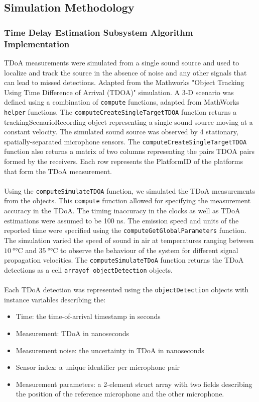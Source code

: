 \documentclass[a4paper,11pt]{article}
\begin{document}
\subsection{Simulation Methodology}

  
\subsubsection{Time Delay Estimation Subsystem Algorithm Implementation}
TDoA measurements were simulated from a single sound source and used to localize and track the source in the absence of noise and any other signals that can lead to missed detections. Adapted from the Mathworks "Object Tracking Using Time Difference of Arrival (TDOA)" simulation. A 3-D scenario was defined using a combination of \texttt{compute} functions, adapted from MathWorks \texttt{helper} functions. The \texttt{computeCreateSingleTargetTDOA} function returns a trackingScenarioRecording object representing a single sound source moving at a constant velocity. The simulated sound source was observed by 4 stationary, spatially-separated microphone sensors. The \texttt{computeCreateSingleTargetTDOA} function also returns a matrix of two columns representing the pairs TDOA pairs formed by the receivers. Each row represents the PlatformID of the platforms that form the TDoA measurement. \\\\
Using the \texttt{computeSimulateTDOA} function, we simulated the TDoA measurements from the objects. This \texttt{compute} function allowed for specifying the measurement accuracy in the TDoA. The timing inaccuracy in the clocks as well as TDoA estimations were assumed to be 100 ns. The emission speed and units of the reported time were specified using the \texttt{computeGetGlobalParameters} function. The simulation varied the speed of sound in air at temperatures ranging between $\SI{10}{\degree\celsius}$ and $\SI{35}{\degree\celsius}$ to observe the behaviour of the system for different signal propagation velocities. The \texttt{computeSimulateTDoA} function returns the TDoA detections as a cell \texttt{arrayof objectDetection} objects. \\\\
Each TDoA detection was represented using the \texttt{objectDetection} objects with instance variables describing the: \\
\begin{itemize}
	\item 
	Time: the time-of-arrival timestamp in seconds 
	\item
	Measurement: TDoA in nanoseconds 
	\item
	Measurement noise: the uncertainty in TDoA in nanoseconds 
	\item
	Sensor index: a unique identifier per microphone pair 
	\item
	Measurement parameters: a 2-element struct array with two fields describing the position of the reference microphone and the other microphone.  
\end{itemize}
\end{document}
